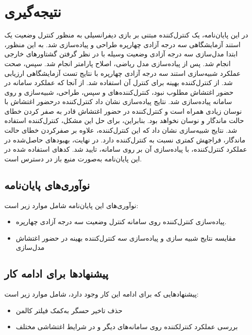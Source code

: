 \chapter{نتیجه‌گیری}
در این پایان‌نامه، یک کنترل‌کننده مبتنی بر بازی دیفرانسیلی به منظور کنترل وضعیت یک استند آزمایشگاهی سه درجه آزادی چهارپره طراحی و پیاده‌سازی شد. 
به این منظور، ابتدا مدل‌سازی سه درجه آزادی وضعیت وسیله با در نظر گرفتن گشتاورهای خارجی انجام شد. پس از پیاده‌سازی مدل ریاضی، اصلاح پارامتر انجام شد. سپس، صحت عملکرد شبیه‌سازی استند سه درجه آزادی چهارپره با نتایج تست آزمایشگاهی ارزیابی شد.
	 از کنترل‌کننده بهینه  برای کنترل آن استفاده شد. از آنجا که عملكرد سامانه در حضور اغتشاش مطلوب نبود، کنترل‌کننده‌های  و سپس،  طراحی، شبیه‌سازی  و روی سامانه پیاده‌سازی شد. نتایج پیاده‌سازی نشان داد کنترل‌کننده  درحضور اغتشاش با نوسان زیادی همراه است و کنترل‌کننده  در حضور اغتشاش قادر به صفر کردن خطای حالت ماندگار و نوسان نخواهد بود. بنابراین، برای حل این مشكل، کنترل‌کننده  استفاده شد. نتایج شبیه‌سازی نشان داد که این کنترل‌کننده، علاوه بر صفرکردن خطای حالت ماندگار، فراجهش کمتری نسبت به کنترل‌کننده  دارد. در نهایت، بهبودهای حاصل‌شده در عملكرد کنترل‌کننده، با پیاده‌سازی آن بر روی سامانه، تایید شد.
	 کدهای استفاده شده در این پایان‌نامه به‌صورت منبع باز 
	 در دسترس است.
\newpage



 \section{نوآوری‌های پایان‌نامه}
 نوآوری‌های این پایان‌نامه شامل موارد زیر است:
 \begin{itemize}
 	\item پیاده‌سازی کنترل‌کننده  روی سامانه کنترل وضعیت سه درجه آزادی چهارپره.
 	\item مقایسه نتایج شبیه سازی و پیاده‌سازی سه کنترل‌کننده بهینه در حضور اغتشاش مدل‌سازی
 \end{itemize}

\section{پیشنهادها برای ادامه کار}
پیشنهادهایی که برای ادامه این کار وجود دارد، شامل موارد زیر است:
 \begin{itemize}
	\item حذف تاخیر حسگر به‌کمک فیلتر کالمن
	\item بررسی عملكرد کنترلکننده  روی سامانه‌های دیگر و در شرایط اغتشاشی مختلف
\end{itemize}